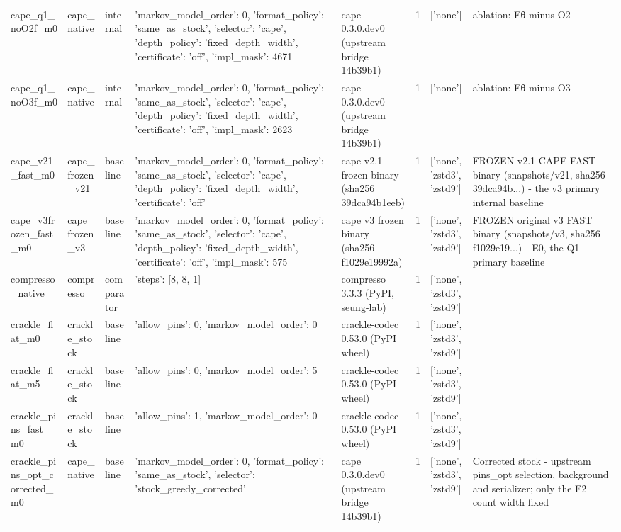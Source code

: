 \begin{table}[t]
\begin{tabular}{llllllll}
cape\_q1\_noO2f\_m0 & cape\_native & internal & {'markov\_model\_order': 0, 'format\_policy': 'same\_as\_stock', 'selector': 'cape', 'depth\_policy': 'fixed\_depth\_width', 'certificate': 'off', 'impl\_mask': 4671} & cape 0.3.0.dev0 (upstream bridge 14b39b1) & 1 & ['none'] & ablation: Eθ minus O2 \\
cape\_q1\_noO3f\_m0 & cape\_native & internal & {'markov\_model\_order': 0, 'format\_policy': 'same\_as\_stock', 'selector': 'cape', 'depth\_policy': 'fixed\_depth\_width', 'certificate': 'off', 'impl\_mask': 2623} & cape 0.3.0.dev0 (upstream bridge 14b39b1) & 1 & ['none'] & ablation: Eθ minus O3 \\
cape\_v21\_fast\_m0 & cape\_frozen\_v21 & baseline & {'markov\_model\_order': 0, 'format\_policy': 'same\_as\_stock', 'selector': 'cape', 'depth\_policy': 'fixed\_depth\_width', 'certificate': 'off'} & cape v2.1 frozen binary (sha256 39dca94b1eeb) & 1 & ['none', 'zstd3', 'zstd9'] & FROZEN v2.1 CAPE-FAST binary (snapshots/v21, sha256 39dca94b...) - the v3 primary internal baseline \\
cape\_v3frozen\_fast\_m0 & cape\_frozen\_v3 & baseline & {'markov\_model\_order': 0, 'format\_policy': 'same\_as\_stock', 'selector': 'cape', 'depth\_policy': 'fixed\_depth\_width', 'certificate': 'off', 'impl\_mask': 575} & cape v3 frozen binary (sha256 f1029e19992a) & 1 & ['none', 'zstd3', 'zstd9'] & FROZEN original v3 FAST binary (snapshots/v3, sha256 f1029e19...) - E0, the Q1 primary baseline \\
compresso\_native & compresso & comparator & {'steps': [8, 8, 1]} & compresso 3.3.3 (PyPI, seung-lab) & 1 & ['none', 'zstd3', 'zstd9'] &  \\
crackle\_flat\_m0 & crackle\_stock & baseline & {'allow\_pins': 0, 'markov\_model\_order': 0} & crackle-codec 0.53.0 (PyPI wheel) & 1 & ['none', 'zstd3', 'zstd9'] &  \\
crackle\_flat\_m5 & crackle\_stock & baseline & {'allow\_pins': 0, 'markov\_model\_order': 5} & crackle-codec 0.53.0 (PyPI wheel) & 1 & ['none', 'zstd3', 'zstd9'] &  \\
crackle\_pins\_fast\_m0 & crackle\_stock & baseline & {'allow\_pins': 1, 'markov\_model\_order': 0} & crackle-codec 0.53.0 (PyPI wheel) & 1 & ['none', 'zstd3', 'zstd9'] &  \\
crackle\_pins\_opt\_corrected\_m0 & cape\_native & baseline & {'markov\_model\_order': 0, 'format\_policy': 'same\_as\_stock', 'selector': 'stock\_greedy\_corrected'} & cape 0.3.0.dev0 (upstream bridge 14b39b1) & 1 & ['none', 'zstd3', 'zstd9'] & Corrected stock - upstream pins\_opt selection, background and serializer; only the F2 count width fixed \\

\end{tabular}
\end{table}
